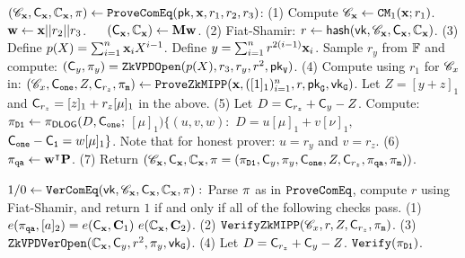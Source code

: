 \begin{footnotesize}
\begin{algorithm}[bt]
$({\mathscr{C}}_{{{\mathbf {x}}}}, {\mathsf{C}}_{{{\mathbf {x}}}}, {\mathbb{C}}_{{{\mathbf {x}}}}, \pi)
	\leftarrow {\texttt{ProveComEq}}(\mathsf{pk}, {{\mathbf {x}}}, r_1, r_2, r_3)$:  \newline
(1) Compute 
	${\mathscr{C}}_{{{\mathbf {x}}}} \leftarrow {\mathtt{CM}}_1({{\mathbf {x}}}; r_1)$.  ~~
	${{\mathbf {w}}} \leftarrow {{\mathbf {x}}} || r_2 || r_3$.  ~~
	$({\mathsf{C}}_{{{\mathbf {x}}}}, {\mathbb{C}}_{{{\mathbf {x}}}}) 
		\leftarrow {{\mathbf {M}}} {{\mathbf {w}}}$. \newline
(2) Fiat-Shamir: $r \leftarrow \mathsf{hash}(\mathsf{vk}, {\mathscr{C}}_{{{\mathbf {x}}}}, {\mathsf{C}}_{{{\mathbf {x}}}}, {\mathbb{C}}_{{{\mathbf {x}}}})$. \newline
(3) Define $p(X) = \sum_{i=1}^n {{\mathbf {x}}}_i X^{i-1}$.
	Define $y = \sum_{i=1}^{n} r^{2(i-1)} {{\mathbf {x}}}_i$.
	Sample $r_y$ from $\mathbb{F}$ and compute: 
	$({\mathsf{C}}_y, \pi_y) = \texttt{ZkVPDOpen}(p(X), r_3, r_y, r^2, \mathsf{pk}_{{\tt V}})$.
	\newline
(4) Compute using $r_1$ for ${\mathscr{C}}_{x}$ in:
	$({\mathscr{C}}_{x}, {\mathsf{C}}_{{\tt one}}, Z, {\mathsf{C}}_{r_z}, \pi_{{\tt m}})
	\leftarrow {\mathtt{ProveZkMIPP}}({{\mathbf {x}}}, ([1]_1)_{i=1}^n, r, \mathsf{pk}_{{\tt G}},
	\mathsf{vk}_{{\tt G}})$. \newline
	Let $Z = [y+z]_1$ and ${\mathsf{C}}_{r_z} = [z]_1 + r_z[\mu]_1$ in the
	above. \newline
(5) Let $D = {\mathsf{C}}_{r_z} + {\mathsf{C}}_{y} - Z$. 
	Compute: \newline $\pi_{{\tt D1}} 
		\leftarrow {\pi_{\textsf{DLOG}}}(D,{\mathsf{C}}_{{\tt one}};$ 
	$[\mu]_1)$$\{(u,v,w):$ $D = u[\mu]_1 + v[\nu]_1,$ ${\mathsf{C}}_{{\tt one}}-{\mathsf{C}}_{{\tt 1}}=w[\mu]_1\}$.
	Note that for honest prover: $u = r_y$ and $v=r_z$. \newline
(6)  $\pi_{{\tt qa}} \leftarrow {{\mathbf {w}}}^\intercal {{\mathbf {P}}}$. \newline
(7) Return $({\mathscr{C}}_{{{\mathbf {x}}}}, {\mathsf{C}}_{{{\mathbf {x}}}}, {\mathbb{C}}_{{{\mathbf {x}}}},
	\pi=(\pi_{{\tt D1}}, {\mathsf{C}}_y, \pi_y, {\mathsf{C}}_{{\tt one}}, 
		Z, {\mathsf{C}}_{r_z},
		\pi_{{\tt qa}},\pi_{{\tt m}}))$. \newline

$1/0 \leftarrow {\texttt{VerComEq}}(\mathsf{vk}, 
	{\mathscr{C}}_{{{\mathbf {x}}}}, {\mathsf{C}}_{{{\mathbf {x}}}}, {\mathbb{C}}_{{{\mathbf {x}}}},
	\pi):$  \newline
Parse $\pi$ as in ${\texttt{ProveComEq}}$, compute $r$ using Fiat-Shamir,
and return $1$ if and only if all of the following checks pass. \newline
(1) $e(\pi_{{\tt qa}}, [a]_2) = e({\mathsf{C}}_{{{\mathbf {x}}}}, {{\mathbf {C}}}_1) 
	~e({\mathbb{C}}_{{{\mathbf {x}}}}, {{\mathbf {C}}}_2)$. \newline
(2) ${\mathtt{VerifyZkMIPP}}({\mathscr{C}}_{x}, r, Z, {\mathsf{C}}_{r_z}, \pi_{{\tt m}})$. \newline
(3) $\texttt{ZkVPDVerOpen}({\mathbb{C}}_{{{\mathbf {x}}}}, {\mathsf{C}}_y, r^2, \pi_{y}, \mathsf{vk}_{{\tt G}})$. \newline
(4) Let $D = {\mathsf{C}}_{r_z} + {\mathsf{C}}_y - Z$.
   $\texttt{Verify}(\pi_{{\tt D1}})$.

\caption{Equivalence Between Hiding AFGHO Commitment and Pedersen Vector Commitment}
\label{fig_eqv}
\end{algorithm}
\end{footnotesize}

